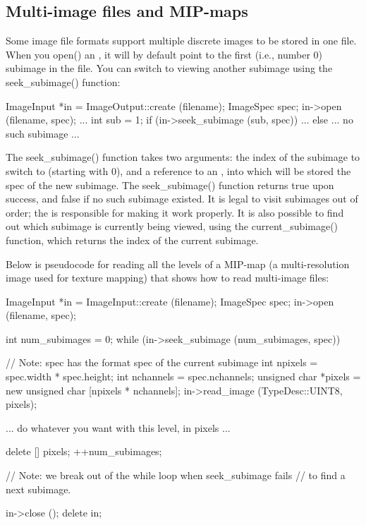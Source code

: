 %


\subsection{Multi-image files and MIP-maps}
\label{sec:imageinput:multiimage}

Some image file formats support multiple discrete images to be stored
in one file.  When you {\cf open()} an \ImageOutput, it will by default
point to the first (i.e., number 0) subimage in the file.  You can
switch to viewing another subimage using the {\cf seek_subimage()} 
function:

\begin{code}
        ImageInput *in = ImageOutput::create (filename);
        ImageSpec spec;
        in->open (filename, spec);
        ...
        int sub = 1;
        if (in->seek_subimage (sub, spec)) {
            ...
        } else {
            ... no such subimage ...
        }
\end{code}

The {\cf seek_subimage()} function takes two arguments: the index of the
subimage to switch to (starting with 0), and a reference to an
\ImageSpec, into which will be stored the spec of the new
subimage.  The {\cf seek_subimage()} function returns {\cf true} upon
success, and {\cf false} if no such subimage existed.  It is legal to
visit subimages out of order; the \ImageInput is responsible for making
it work properly.  It is also possible to find out which subimage is
currently being viewed, using the {\cf current_subimage()} function,
which returns the index of the current subimage.

Below is pseudocode for reading all the levels of a MIP-map (a
multi-resolution image used for texture mapping) that shows how to read
multi-image files:

\begin{code}
        ImageInput *in = ImageInput::create (filename);
        ImageSpec spec;
        in->open (filename, spec);

        int num_subimages = 0;
        while (in->seek_subimage (num_subimages, spec)) {
            // Note: spec has the format spec of the current subimage
            int npixels = spec.width * spec.height;
            int nchannels = spec.nchannels;
            unsigned char *pixels = new unsigned char [npixels * nchannels];
            in->read_image (TypeDesc::UINT8, pixels);

            ... do whatever you want with this level, in pixels ...

            delete [] pixels;
            ++num_subimages;
        }
        // Note: we break out of the while loop when seek_subimage fails
        // to find a next subimage.

        in->close ();
        delete in;
\end{code}

